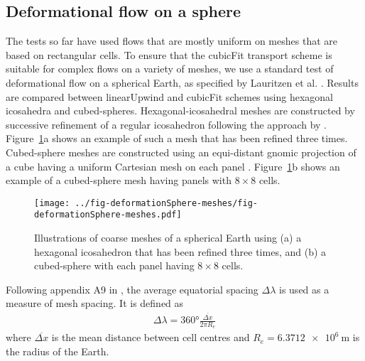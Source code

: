 \subsection{Deformational flow on a sphere}
\label{sec:deformationSphere}
The tests so far have used flows that are mostly uniform on meshes that are based on rectangular cells.
To ensure that the cubicFit transport scheme is suitable for complex flows on a variety of meshes, we use a standard test of deformational flow on a spherical Earth, as specified by Lauritzen et al. \citep{lauritzen2012}.  
Results are compared between linearUpwind and cubicFit schemes using hexagonal icosahedra and cubed-spheres.
Hexagonal-icosahedral meshes are constructed by successive refinement of a regular icosahedron following the approach by \citep{thuburn2014}.
Figure~\ref{fig:sphere-meshes}a shows an example of such a mesh that has been refined three times.
Cubed-sphere meshes are constructed using an equi-distant gnomic projection of a cube having a uniform Cartesian mesh on each panel \citep{staniforth-thuburn2012}.
Figure~\ref{fig:sphere-meshes}b shows an example of a cubed-sphere mesh having panels with $8 \times 8$ cells.

\begin{figure}
	\centering
	\texttt{[image: ../fig-deformationSphere-meshes/fig-deformationSphere-meshes.pdf]}
	\caption{Illustrations of coarse meshes of a spherical Earth using (a) a hexagonal icosahedron that has been refined three times, and (b) a cubed-sphere with each panel having $8 \times 8$ cells.}
	\label{fig:sphere-meshes}
\end{figure}

Following appendix A9 in \citep{lauritzen2014}, the average equatorial spacing $\Delta \lambda$ is used as a measure of mesh spacing.  It is defined as
\begin{align}
	\Delta \lambda = \ang{360} \frac{\overline{\Delta x}}{2 \pi R_e}
\end{align}
where $\overline{\Delta x}$ is the mean distance between cell centres and $R_e = \SI{6.3712e6}{\meter}$ is the radius of the Earth.

